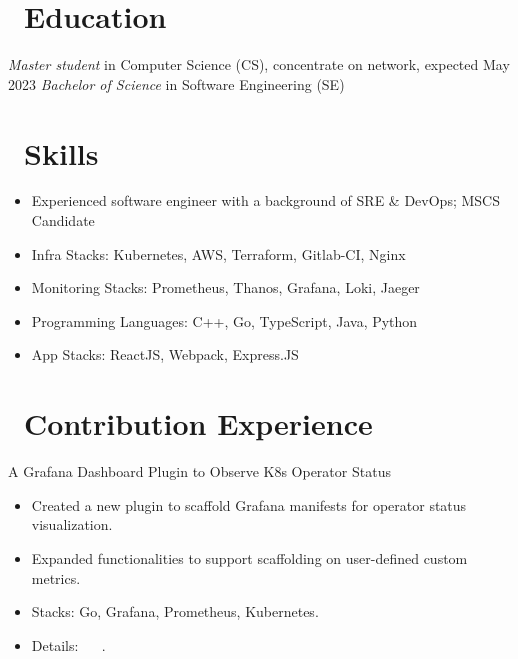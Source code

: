 \documentclass{resume}
\begin{document}



\section{\faGraduationCap\ Education}
\textit{Master student} in Computer Science (CS), concentrate on network, expected May 2023
\textit{Bachelor of Science} in Software Engineering (SE)

\section{\faCogs\ Skills}
\begin{itemize}[parsep=0.5ex]
  \item Experienced software engineer with a background of SRE \& DevOps; MSCS Candidate
  \item Infra Stacks: Kubernetes, AWS, Terraform, Gitlab-CI, Nginx
  \item Monitoring Stacks: Prometheus, Thanos, Grafana, Loki, Jaeger
  \item Programming Languages: C++, Go, TypeScript, Java, Python
  \item App Stacks: ReactJS, Webpack, Express.JS
\end{itemize}

\section{\faUsers\ Contribution Experience}
A Grafana Dashboard Plugin to Observe K8s Operator Status
\begin{itemize}
  \item Created a new plugin to scaffold Grafana manifests for operator status visualization.
  \item Expanded functionalities to support scaffolding on user-defined custom metrics.
  \item Stacks: Go, Grafana, Prometheus, Kubernetes.
  \item Details:
     \textperiodcentered\
     \textperiodcentered\
    .
\end{itemize}
\end{document}

